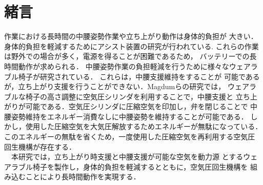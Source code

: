 \section{緒言}
作業における長時間の中腰姿勢作業や立ち上がり動作は身体的負担が
大きい．身体的負担を軽減するためにアシスト装置の研究が行われている.
これらの作業は野外での場合が多く，電源を得ることが困難であるため，
バッテリーでの長時間動作が求められる．
中腰姿勢作業の負担軽減を行うために様々なウェアラブル椅子が研究されている\cite{noonee}\cite{yao}\cite{osada1}\cite{isu}．
これらは，中腰支援維持をすることが
可能であるが，立ち上がり支援を行うことができない．Magdumらの研究では，
ウェアラブルな椅子の高さ調整に空気圧シリンダを利用することで，中腰支援と
立ち上がりが可能である．空気圧シリンダに圧縮空気を印加し，弁を閉じることで
中腰姿勢維持をエネルギー消費なしに中腰姿勢を維持することが可能である\cite{nita}．
しかし，使用した圧縮空気を大気圧解放するためエネルギーが無駄になっている．
このエネルギーの無駄を省くため，一度使用した圧縮空気を再利用する空気圧
回生機構が存在する\cite{kumakura}\cite{kuma}\cite{sasaki}．\\
　本研究では，立ち上がり時支援と中腰支援が可能な空気を動力源
とするウェアラブル椅子を製作し，身体的負担を軽減するとともに，空気圧回生機構を
組み込むことにより長時間動作を実現する．
